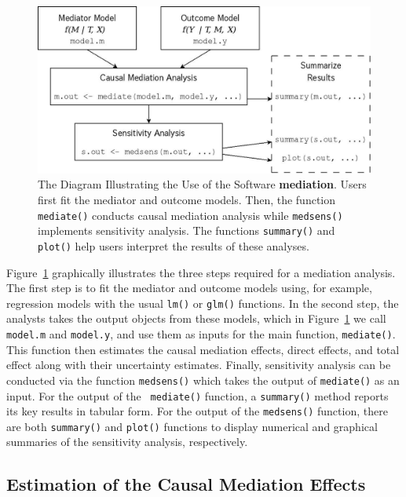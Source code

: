 \documentclass[11pt,letterpaper]{article}
\theoremstyle{plain}
\newcommand\bmediation{{\bf mediation}}
\begin{document}
\begin{figure}[t]
  \begin{center}
    \includegraphics[scale=.35]{mediation-chart.jpg}
  \end{center}
  \caption{The Diagram Illustrating the Use of the Software
    \bmediation.  Users first fit the mediator and outcome models.
    Then, the function {\tt mediate()} conducts causal mediation
    analysis while {\tt medsens()} implements sensitivity analysis.  The
    functions {\tt summary()} and {\tt plot()} help users interpret the
    results of these analyses.} \label{fg:chart}
\end{figure}

Figure~\ref{fg:chart} graphically illustrates the three steps required
for a mediation analysis. The first step is to fit the mediator and
outcome models using, for example, regression models with the usual
\texttt{lm()} or \texttt{glm()} functions. In the second step, the
analysts takes the output objects from these models, which in
Figure~\ref{fg:chart} we call {\tt model.m} and {\tt model.y}, and use
them as inputs for the main function, {\tt mediate()}. This function
then estimates the causal mediation effects, direct effects, and total
effect along with their uncertainty estimates. Finally, sensitivity
analysis can be conducted via the function {\tt medsens()} which takes
the output of {\tt mediate()} as an input.  For the output of the {\tt
  mediate()} function, a {\tt summary()} method reports its key
results in tabular form.  For the output of the {\tt medsens()}
function, there are both {\tt summary()} and {\tt plot()} functions to
display numerical and graphical summaries of the sensitivity analysis,
respectively.

\subsection{Estimation of the Causal Mediation Effects}
\end{document}
